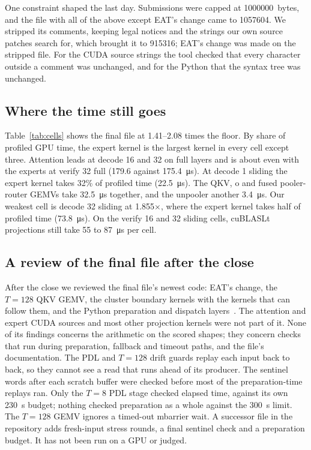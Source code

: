 \documentclass[11pt]{article}
\begin{document}
One constraint shaped the last day. Submissions were capped at
\SI{1000000}{bytes}, and the file with all of the above except EAT's change came
to \num{1057604}. We stripped its comments, keeping legal notices and the strings
our own source patches search for, which brought it to \num{915316}; EAT's change
was made on the stripped file. For the CUDA source strings the tool checked that
every character outside a comment was unchanged, and for the Python that the
syntax tree was unchanged.

\subsection{Where the time still goes}

Table~\ref{tab:cells} shows the final file at 1.41--2.08 times the floor. By share
of profiled GPU time, the expert kernel is the largest kernel in every cell except
three. Attention leads at decode 16 and 32 on full layers and is about even with
the experts at verify 32 full (\SI{179.6}{} against \SI{175.4}{\micro\second}). At
decode 1 sliding the expert kernel takes 32\% of profiled time
(\SI{22.5}{\micro\second}). The QKV, o and fused pooler-router GEMVs take
\SI{32.5}{\micro\second} together, and the unpooler another
\SI{3.4}{\micro\second}. Our weakest cell is decode 32 sliding at 1.855$\times$,
where the expert kernel takes half of profiled time (\SI{73.8}{\micro\second}). On
the verify 16 and 32 sliding cells, cuBLASLt projections still take \SI{55}{} to
\SI{87}{\micro\second} per cell.

\subsection{A review of the final file after the close}

After the close we reviewed the final file's newest code: EAT's change, the
$T=128$ QKV GEMV, the cluster boundary kernels with the kernels that can follow
them, and the Python preparation and dispatch layers~\cite{review}. The attention
and expert CUDA sources and most other projection kernels were not part of it.
None of its findings concerns the arithmetic on the scored shapes; they concern
checks that run during preparation, fallback and timeout paths, and the file's
documentation. The PDL and $T=128$ drift guards replay each input back to back,
so they cannot see a read that runs ahead of its producer. The sentinel words
after each scratch buffer were checked before most of the preparation-time
replays ran. Only the $T=8$ PDL stage checked elapsed time, against its own
\SI{230}{\second} budget; nothing checked preparation as a whole against the
\SI{300}{\second} limit. The $T=128$ GEMV ignores a timed-out mbarrier wait. A successor file in the repository adds fresh-input stress rounds,
a final sentinel check and a preparation budget. It has not been run on a GPU or
judged.
\end{document}
